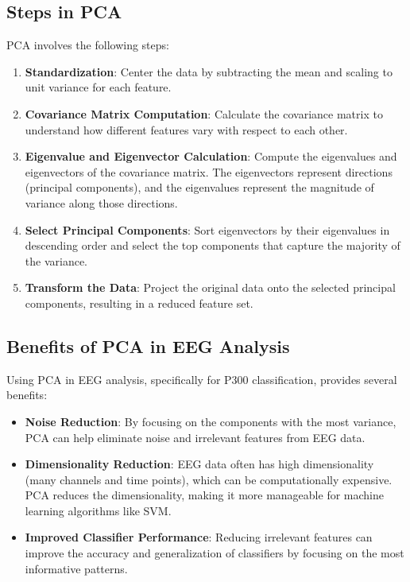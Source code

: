 \documentclass{article}
\begin{document}
\subsection{Steps in PCA}
PCA involves the following steps:
\begin{enumerate}
    \item \textbf{Standardization}: Center the data by subtracting the mean and scaling to unit variance for each feature.
    \item \textbf{Covariance Matrix Computation}: Calculate the covariance matrix to understand how different features vary with respect to each other.
    \item \textbf{Eigenvalue and Eigenvector Calculation}: Compute the eigenvalues and eigenvectors of the covariance matrix. The eigenvectors represent directions (principal components), and the eigenvalues represent the magnitude of variance along those directions.
    \item \textbf{Select Principal Components}: Sort eigenvectors by their eigenvalues in descending order and select the top components that capture the majority of the variance.
    \item \textbf{Transform the Data}: Project the original data onto the selected principal components, resulting in a reduced feature set.
\end{enumerate}

\subsection{Benefits of PCA in EEG Analysis}
Using PCA in EEG analysis, specifically for P300 classification, provides several benefits:
\begin{itemize}
    \item \textbf{Noise Reduction}: By focusing on the components with the most variance, PCA can help eliminate noise and irrelevant features from EEG data.
    \item \textbf{Dimensionality Reduction}: EEG data often has high dimensionality (many channels and time points), which can be computationally expensive. PCA reduces the dimensionality, making it more manageable for machine learning algorithms like SVM.
    \item \textbf{Improved Classifier Performance}: Reducing irrelevant features can improve the accuracy and generalization of classifiers by focusing on the most informative patterns.
\end{itemize}
\end{document}
